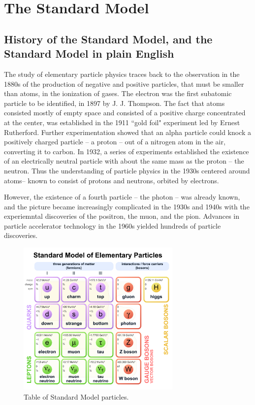 \documentclass{article}
\begin{document}
\section{The Standard Model}

\subsection{History of the Standard Model, and the Standard Model in plain English}

The study of elementary particle physics traces back to the observation in the 1880s of the production of negative and positive particles, that must be smaller than atoms, in the ionization of gases. The electron was the first subatomic particle to be identified, in 1897 by J. J. Thompson. The fact that atoms consisted mostly of empty space and consisted of a positive charge concentrated at the center, was established in the 1911 ``gold foil" experiment led by Ernest Rutherford. Further experimentation showed that an alpha particle could knock a positively charged particle -- a proton -- out of a nitrogen atom in the air, converting it to carbon. In 1932, a series of experiments established the existence of an electrically neutral particle with about the same mass as the proton -- the neutron. Thus the understanding of particle physics in the 1930s centered around atoms-- known to consist of protons and neutrons, orbited by electrons. 

However, the existence of a fourth particle -- the photon -- was already known, and the picture became increasingly complicated in the 1930s and 1940s with the experiemntal discoveries of the positron, the muon, and the pion. Advances in particle accelerator technology in the 1960s yielded hundreds of particle discoveries. 

\begin{figure}[ht]
    \centering
    \includegraphics[width=8cm]{figures/Standard_Model_of_Elementary_Particles.pdf}
    \caption{Table of Standard Model particles.}
    \label{fig:intro-standard-model}
\end{figure}
\end{document}
